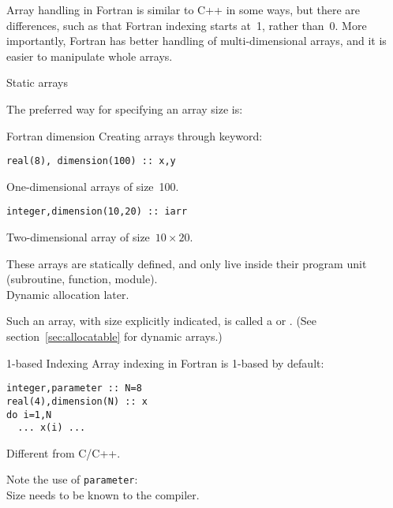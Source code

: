 
Array handling in Fortran is similar to C++ in some ways, but there
are differences, such as that  Fortran indexing starts at~1, rather
than~0. More importantly, Fortran has better handling of
multi-dimensional arrays, and it is easier to manipulate whole arrays.

 {Static arrays}

The preferred way for specifying an array size is:

\begin{block}{Fortran dimension}
  \label{sl:farray-dimension}
Creating arrays through 
keyword:

\begin{lstlisting}
real(8), dimension(100) :: x,y
\end{lstlisting}
One-dimensional arrays of size~100.

\begin{lstlisting}
integer,dimension(10,20) :: iarr
\end{lstlisting}
Two-dimensional array of size~$10\times 20$.

These arrays are statically defined, and only live inside their
program unit (subroutine, function, module).\\
Dynamic allocation later.
\end{block}

Such an array, with size explicitly indicated, is called a
 or .
(See section~\ref{sec:allocatable} for
dynamic arrays.)

\begin{block}{1-based Indexing}
  \label{sl:farray-base1}
Array indexing in Fortran is 1-based by default:
\begin{lstlisting}
integer,parameter :: N=8
real(4),dimension(N) :: x
do i=1,N
  ... x(i) ...
\end{lstlisting}
Different from C/C++.

Note the use of \lstinline{parameter}:
\\
Size needs to be known to the compiler.
\end{block}

